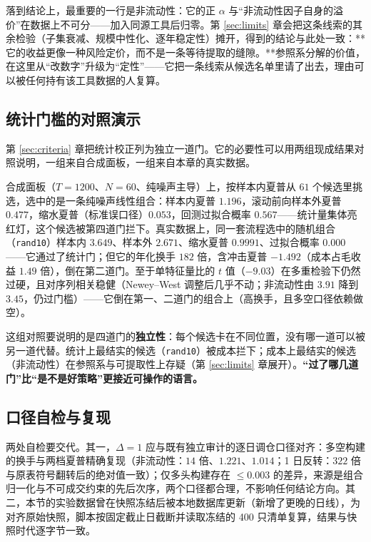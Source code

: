 落到结论上，最重要的一行是非流动性：它的正 $\alpha$ 与“非流动性因子自身的溢价”在数据上不可分——加入同源工具后归零。第 \ref{sec:limits} 章会把这条线索的其余检验（子集衰减、规模中性化、逐年稳定性）摊开，得到的结论与此处一致：**它的收益更像一种风险定价，而不是一条等待提取的缝隙。**参照系分解的价值，在这里从“改数字”升级为“定性”——它把一条线索从候选名单里请了出去，理由可以被任何持有该工具数据的人复算。

\subsection{统计门槛的对照演示}

第 \ref{sec:criteria} 章把统计校正列为独立一道门。它的必要性可以用两组现成结果对照说明，一组来自合成面板，一组来自本章的真实数据。

合成面板（$T=1200$、$N=60$、纯噪声主导）上，按样本内夏普从 $61$ 个候选里挑选，选中的是一条纯噪声线性组合：样本内夏普 $1.196$，滚动前向样本外夏普 $0.477$，缩水夏普（标准误口径）$0.053$，回测过拟合概率 $0.567$——统计量集体亮红灯，这个候选被第四道门拦下。真实数据上，同一套流程选中的随机组合（\texttt{rand10}）样本内 $3.649$、样本外 $2.671$、缩水夏普 $0.9991$、过拟合概率 $0.000$——它通过了统计门；但它的年化换手 $182$ 倍，含冲击夏普 $-1.492$（成本占毛收益 $1.49$ 倍），倒在第二道门。至于单特征量比的 $t$ 值（$-9.03$）在多重检验下仍然过硬，且对序列相关稳健（Newey--West 调整后几乎不动；非流动性由 $3.91$ 降到 $3.45$，仍过门槛\cite{newyewest1987}）——它倒在第一、二道门的组合上（高换手，且多空口径依赖做空）。

这组对照要说明的是四道门的\textbf{独立性}：每个候选卡在不同位置，没有哪一道可以被另一道代替。统计上最结实的候选（\texttt{rand10}）被成本拦下；成本上最结实的候选（非流动性）在参照系与可提取性上存疑（第 \ref{sec:limits} 章展开）。\textbf{“过了哪几道门”比“是不是好策略”更接近可操作的语言。}

\subsection{口径自检与复现}

两处自检要交代。其一，$\Delta=1$ 应与既有独立审计的逐日调仓口径对齐：多空构建的换手与两档夏普精确复现（非流动性：$14$ 倍、$1.221$、$1.014$；1 日反转：$322$ 倍与原表符号翻转后的绝对值一致）；仅多头构建存在 $\le0.003$ 的差异，来源是组合归一化与不可成交约束的先后次序，两个口径都合理，不影响任何结论方向。其二，本节的实验数据曾在快照冻结后被本地数据库更新（新增了更晚的日线），为对齐原始快照，脚本按固定截止日截断并读取冻结的 400 只清单复算，结果与快照时代逐字节一致。


